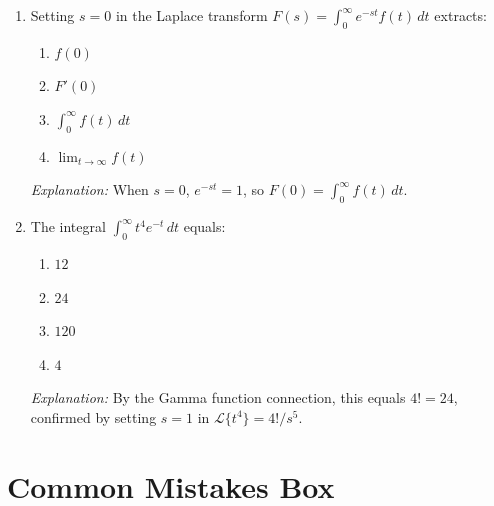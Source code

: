 \documentclass[12pt,a4paper]{article}
\begin{document}
\begin{enumerate}[label=\textbf{MCQ \arabic*.}, leftmargin=*, itemsep=1.6em]
\item Setting $s = 0$ in the Laplace transform $F(s) = \int_0^\infty e^{-st}f(t)\,dt$
      extracts:

\begin{enumerate}[label=(\alph*)]
  \item $f(0)$ \quad
  \item $F'(0)$ \quad
  \item \textbf{$\displaystyle\int_0^\infty f(t)\, dt$} \quad
  \item $\lim_{t\to\infty} f(t)$
\end{enumerate}
\textit{Explanation:} When $s = 0$, $e^{-st} = 1$, so $F(0) = \int_0^\infty f(t)\,dt$.

\item The integral $\displaystyle\int_0^\infty t^4 e^{-t}\, dt$ equals:

\begin{enumerate}[label=(\alph*)]
  \item $12$ \quad
  \item \textbf{$24$} \quad
  \item $120$ \quad
  \item $4$
\end{enumerate}
\textit{Explanation:} By the Gamma function connection, this equals $4! = 24$,
confirmed by setting $s = 1$ in $\mathcal{L}\{t^4\} = 4!/s^5$.

\end{enumerate}

\section{Common Mistakes Box}
\end{document}
